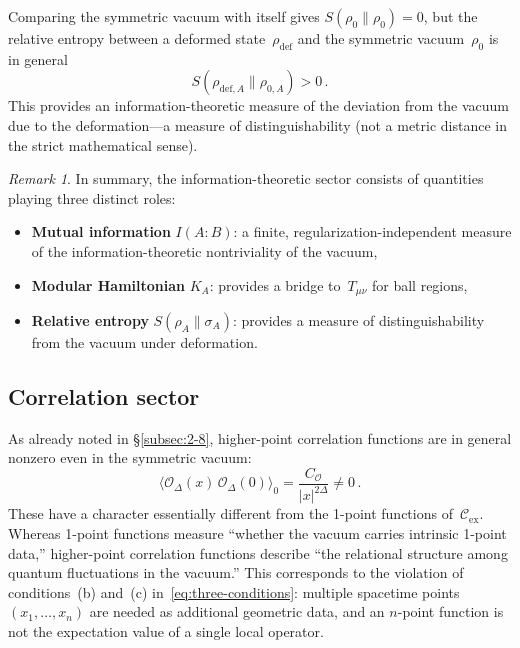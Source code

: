 \documentclass[
  aps,
  prd,
  preprint,
  groupedaddress,
  nofootinbib,
  longbibliography
]{revtex4-2}
\theoremstyle{remark}
\newtheorem{remark}[definition]{Remark}
\newcommand{\Cex}{\mathcal{C}_{\mathrm{ex}}}
\begin{document}
Comparing the symmetric vacuum with itself gives
$S(\rho_0\|\rho_0)=0$, but the relative entropy between a
deformed state~$\rho_{\mathrm{def}}$ and the symmetric
vacuum~$\rho_0$ is in general
\begin{equation}\label{eq:rel-ent-pos}
  S(\rho_{\mathrm{def},A}\|\rho_{0,A}) > 0\,.
\end{equation}
This provides an information-theoretic measure of the
deviation from the vacuum due to the deformation---a measure
of distinguishability (not a metric distance in the strict
mathematical sense).

\begin{remark}\label{rem:info-summary}
In summary, the information-theoretic sector consists of
quantities playing three distinct roles:
\begin{itemize}
\item \textbf{Mutual information} $I(A:B)$: a finite,
  regularization-independent measure of the information-theoretic
  nontriviality of the vacuum,
\item \textbf{Modular Hamiltonian} $K_A$: provides a bridge
  to~$T_{\mu\nu}$ for ball regions,
\item \textbf{Relative entropy} $S(\rho_A\|\sigma_A)$: provides
  a measure of distinguishability from the vacuum under
  deformation.
\end{itemize}
\end{remark}

\subsection{Correlation sector}\label{subsec:6-4}

As already noted in \S\ref{subsec:2-8}, higher-point correlation
functions are in general nonzero even in the symmetric vacuum:
\begin{equation}\label{eq:2pt-nonzero-sec6}
  \langle\mathcal{O}_\Delta(x)\,
    \mathcal{O}_\Delta(0)\rangle_0
  = \frac{C_{\mathcal{O}}}{|x|^{2\Delta}} \neq 0\,.
\end{equation}
These have a character essentially different from the 1-point
functions of~$\Cex$.
Whereas 1-point functions measure ``whether the vacuum carries
intrinsic 1-point data,'' higher-point correlation functions
describe ``the relational structure among quantum fluctuations
in the vacuum.''
This corresponds to the violation of conditions~(b) and~(c)
in~\eqref{eq:three-conditions}: multiple spacetime
points~$(x_1,\ldots,x_n)$ are needed as additional geometric
data, and an $n$-point function is not the expectation value of
a single local operator.
\end{document}
